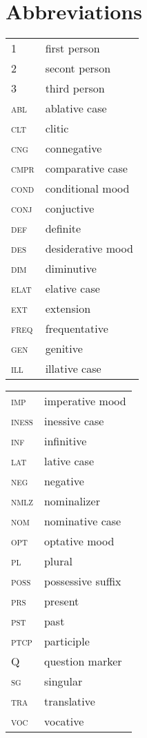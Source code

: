 \documentclass[output=paper,colorlinks,citecolor=brown,draft,draftmode]{langscibook}
\begin{document}
\section*{Abbreviations}

\begin{tabularx}{.5\textwidth}[t]{@{}lQ}
1&				first person\\
2&				secont person\\
3&				third person\\ 
\textsc{abl}&		ablative case\\
\textsc{clt}&		clitic\\
\textsc{cng}&	connegative\\
\textsc{cmpr}&	comparative case\\
\textsc{cond}&	conditional mood\\
\textsc{conj}&	conjuctive\\
\textsc{def}&		definite\\
\textsc{des}&	desiderative mood\\
\textsc{dim}&	diminutive\\
\textsc{elat}&		elative case\\
\textsc{ext}&	extension\\
\textsc{freq}&	frequentative\\
\textsc{gen}&	genitive\\
\textsc{ill}&		illative case\\
\end{tabularx}%
\begin{tabularx}{.5\textwidth}[t]{lQ@{}}
\textsc{imp}&	imperative mood\\
\textsc{iness}&		inessive case\\
\textsc{inf}&	infinitive\\
\textsc{lat}&		lative case\\
\textsc{neg}&	negative\\
\textsc{nmlz}&	nominalizer\\
\textsc{nom}&	nominative case\\
\textsc{opt}&	optative mood\\
\textsc{pl}&		plural\\
\textsc{poss}&	possessive suffix\\
\textsc{prs}&		present\\
\textsc{pst}&	past\\
\textsc{ptcp}&	participle\\
\textsc{Q}&		question marker\\
\textsc{sg}&		singular\\
\textsc{tra}&		translative\\
\textsc{voc}&	vocative\\
\end{tabularx}

{\sloppy
\printbibliography[heading=subbibliography,notkeyword=this,notcategory=sources]
}
\end{document}
